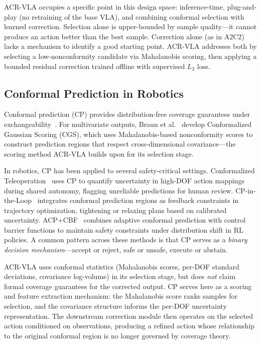 ACR-VLA occupies a specific point in this design space: inference-time, plug-and-play (no retraining of the base VLA), and combining conformal selection with learned correction.
Selection alone is upper-bounded by sample quality---it cannot produce an action better than the best sample.
Correction alone (as in A2C2) lacks a mechanism to identify a good starting point.
ACR-VLA addresses both by selecting a low-nonconformity candidate via Mahalanobis scoring, then applying a bounded residual correction trained offline with supervised $L_2$ loss.

\subsection{Conformal Prediction in Robotics}

Conformal prediction (CP) provides distribution-free coverage guarantees under exchangeability~\cite{angelopoulos2023gentle}.
For multivariate outputs, Braun et al.~\cite{braun2025cgs} develop Conformalized Gaussian Scoring (CGS), which uses Mahalanobis-based nonconformity scores to construct prediction regions that respect cross-dimensional covariance---the scoring method ACR-VLA builds upon for its selection stage.

In robotics, CP has been applied to several safety-critical settings.
Conformalized Teleoperation~\cite{zhao2024conformalized} uses CP to quantify uncertainty in high-DOF action mappings during shared autonomy, flagging unreliable predictions for human review.
CP-in-the-Loop~\cite{wang2025cploop} integrates conformal prediction regions as feedback constraints in trajectory optimization, tightening or relaxing plans based on calibrated uncertainty.
ACP+CBF~\cite{zhou2025acp_cbf} combines adaptive conformal prediction with control barrier functions to maintain safety constraints under distribution shift in RL policies.
A common pattern across these methods is that CP serves as a \emph{binary decision mechanism}---accept or reject, safe or unsafe, execute or abstain.

ACR-VLA uses conformal statistics (Mahalanobis scores, per-DOF standard deviations, covariance log-volume) in its selection stage, but does \emph{not} claim formal coverage guarantees for the corrected output.
CP serves here as a scoring and feature extraction mechanism: the Mahalanobis score ranks samples for selection, and the covariance structure informs the per-DOF uncertainty representation.
The downstream correction module then operates on the selected action conditioned on observations, producing a refined action whose relationship to the original conformal region is no longer governed by coverage theory.

